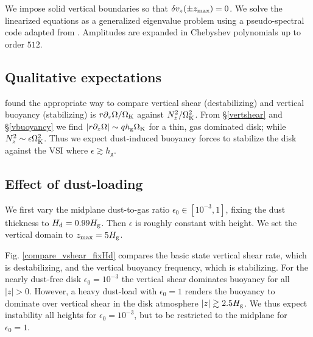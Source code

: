 We impose solid vertical boundaries so that $\delta
v_z(\pm z_\mathrm{max})=0$. We solve the linearized equations as a generalized
eigenvalue problem using a pseudo-spectral code adapted  
from . Amplitudes are expanded in Chebyshev
polynomials up to order $512$. %

\subsection{Qualitative expectations}\label{vsi_est}
 found the appropriate way to compare 
vertical shear (destabilizing) and  vertical buoyancy (stabilizing)
is $r\partial_z\Omega/\Omega_{\rm K}$  against $N_z^2/\Omega_{\rm K}^2$. From 
\S\ref{vertshear} and \S\ref{vbuoyancy} we find $|r\partial_z\Omega|\sim q
h_\mathrm{g}\Omega_{\rm K}$ for a 
thin, gas dominated disk; while $N_z^2\sim \epsilon\Omega_{\rm K}^2$. Thus we
expect dust-induced buoyancy forces to stabilize the disk against the
VSI where $\epsilon \gtrsim h_\mathrm{g}$. 


\subsection{Effect of dust-loading}
We first vary the midplane dust-to-gas ratio 
$\epsilon_0\in[10^{-3},1]$, fixing the dust thickness to  
$H_\mathrm{d}=0.99H_\mathrm{g}$. Then  $\epsilon$ is roughly constant with height. We
set the vertical domain to $z_\mathrm{max}=5H_\mathrm{g}$.  

Fig. \ref{compare_vshear_fixHd} compares the basic state
vertical shear rate, which is destabilizing, and the vertical buoyancy
frequency, which is stabilizing. For the nearly dust-free disk
$\epsilon_0=10^{-3}$ the vertical shear dominates buoyancy for all
$|z|>0$. However, a heavy dust-load with $\epsilon_0=1$ renders the 
buoyancy to dominate over vertical shear in the disk atmosphere 
$|z|\gtrsim 2.5H_\mathrm{g}$. We thus expect instability all heights for 
$\epsilon_0=10^{-3}$, but to be restricted to the midplane for
$\epsilon_0=1$. 

